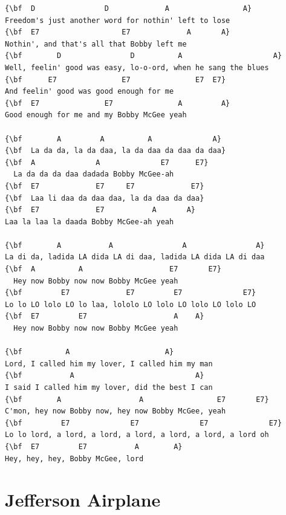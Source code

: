 \documentclass[a4paper]{article}
\begin{document}
\begin{Verbatim}[commandchars=\\\{\}]
{\bf  D                D             A                 A}
Freedom's just another word for nothin' left to lose
{\bf  E7                   E7             A       A}
Nothin', and that's all that Bobby left me
{\bf        D                D          A                     A}
Well, feelin' good was easy, lo-o-ord, when he sang the blues
{\bf      E7               E7               E7  E7}
And feelin' good was good enough for me
{\bf  E7               E7               A         A}
Good enough for me and my Bobby McGee yeah

{\bf        A         A          A              A}
{\bf  La da da, la da daa, la da daa da daa da daa}
{\bf  A              A              E7      E7}
  La da da da daa dadada Bobby McGee-ah
{\bf  E7             E7     E7             E7}
{\bf  Laa li daa da daa daa, la da daa da daa}
{\bf  E7             E7           A       A}
Laa la laa la daada Bobby McGee-ah yeah

{\bf        A           A                A                A}
La di da, ladida LA dida LA di daa, ladida LA dida LA di daa
{\bf  A          A                    E7       E7}
  Hey now Bobby now now Bobby McGee yeah
{\bf         E7             E7         E7              E7}
Lo lo LO lolo LO lo laa, lololo LO lolo LO lolo LO lolo LO 
{\bf  E7         E7                    A    A}
  Hey now Bobby now now Bobby McGee yeah

{\bf          A                      A}
Lord, I called him my lover, I called him my man
{\bf           A                            A}
I said I called him my lover, did the best I can
{\bf        A                  A                 E7       E7}
C'mon, hey now Bobby now, hey now Bobby McGee, yeah
{\bf         E7              E7              E7              E7}
Lo lo lord, a lord, a lord, a lord, a lord, a lord, a lord oh
{\bf  E7         E7           A        A}
Hey, hey, hey, Bobby McGee, lord

\end{Verbatim}
\newpage
\section{Jefferson Airplane}
\end{document}
